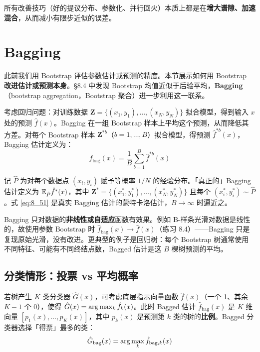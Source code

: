 \begin{remark}
    所有改善技巧（好的提议分布、参数化、并行回火）本质上都是在\textbf{增大谱隙、加速混合}，从而减小有限步近似的误差。
\end{remark}

\section{Bagging}

此前我们用 Bootstrap 评估参数估计或预测的精度。本节展示如何用 Bootstrap \textbf{改进估计或预测本身}。§8.4 中发现 Bootstrap 均值近似于后验平均，\textbf{Bagging}（bootstrap aggregation，Bootstrap 聚合）进一步利用这一联系。

考虑回归问题：对训练数据 $\mathbf{Z} = \{(x_1, y_1), \ldots, (x_N, y_N)\}$ 拟合模型，得到输入 $x$ 处的预测 $\hat{f}(x)$。Bagging 在一组 Bootstrap 样本上平均这个预测，从而降低其方差。对每个 Bootstrap 样本 $\mathbf{Z}^{*b}$（$b = 1, \ldots, B$）拟合模型，得预测 $\hat{f}^{*b}(x)$，Bagging 估计定义为：
\begin{equation}\label{eq:8_51}
    \hat{f}_{\mathrm{bag}}(x) = \frac{1}{B}\sum_{b=1}^{B} \hat{f}^{*b}(x)
\end{equation}

记 $\hat{P}$ 为对每个数据点 $(x_i, y_i)$ 赋予等概率 $1/N$ 的经验分布。「真正的」Bagging 估计定义为 $\mathbb{E}_{\hat{P}}\hat{f}^*(x)$，其中 $\mathbf{Z}^* = \{(x_1^*, y_1^*), \ldots, (x_N^*, y_N^*)\}$ 且每个 $(x_i^*, y_i^*) \sim \hat{P}$。式 \eqref{eq:8_51} 是真实 Bagging 估计的蒙特卡洛估计，$B \to \infty$ 时逼近之。

\begin{remark}
    Bagging 只对数据的\textbf{非线性或自适应}函数有效果。例如 B-样条光滑对数据是线性的，故使用参数 Bootstrap 时 $\hat{f}_{\mathrm{bag}}(x) \to \hat{f}(x)$（练习 8.4）——Bagging 只是复现原始光滑，没有改进。更典型的例子是回归树：每个 Bootstrap 树通常使用不同特征、可能有不同终结点数，Bagged 估计是这 $B$ 棵树预测的平均。
\end{remark}

\subsection{分类情形：投票 vs 平均概率}

若树产生 $K$ 类分类器 $\hat{G}(x)$，可考虑底层指示向量函数 $\hat{f}(x)$（一个 1、其余 $K-1$ 个 0），使得 $\hat{G}(x) = \arg\max_k \hat{f}_k(x)$。此时 Bagged 估计 $\hat{f}_{\mathrm{bag}}(x)$ 是 $K$ 维向量 $[p_1(x), \ldots, p_K(x)]$，其中 $p_k(x)$ 是预测第 $k$ 类的树的\textbf{比例}。Bagged 分类器选择「得票」最多的类：
\begin{equation}
    \hat{G}_{\mathrm{bag}}(x) = \arg\max_k \hat{f}_{\mathrm{bag},k}(x)
\end{equation}

